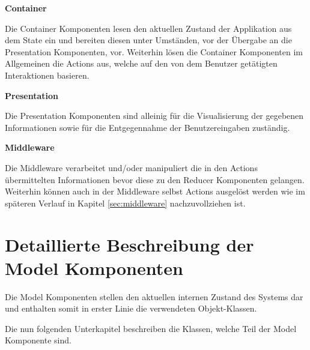 \documentclass[bibliography=totoc,listof=totoc,BCOR=5mm,DIV=12,oneside]{scrbook}
\begin{document}
\par \bigskip \textbf{Container}
\par Die Container Komponenten lesen den aktuellen Zustand der Applikation aus dem State ein und bereiten diesen unter Umständen, vor der Übergabe an die Presentation Komponenten, vor. Weiterhin lösen die Container Komponenten im Allgemeinen die Actions aus, welche auf den von dem Benutzer getätigten Interaktionen basieren.

\par \bigskip \textbf{Presentation}
\par Die Presentation Komponenten sind alleinig für die Visualisierung der gegebenen Informationen sowie für die Entgegennahme der Benutzereingaben zuständig.

\par \bigskip \textbf{Middleware}
\par Die Middleware verarbeitet und/oder manipuliert die in den Actions übermittelten Informationen bevor diese zu den Reducer Komponenten gelangen. Weiterhin können auch in der Middleware selbst Actions ausgelöst werden wie im späteren Verlauf in Kapitel \ref{sec:middleware} nachzuvollziehen ist. 

\newpage
\section{Detaillierte Beschreibung der Model Komponenten}
\label{sec:komponentenDetails}
\par Die Model Komponenten stellen den aktuellen internen Zustand des Systems dar und enthalten somit in erster Linie die verwendeten Objekt-Klassen.
\par \medskip Die nun folgenden Unterkapitel beschreiben die Klassen, welche Teil der  Model Komponente sind.
\end{document}
